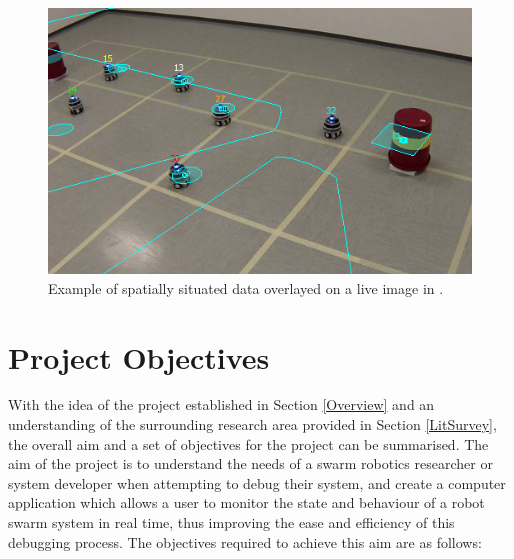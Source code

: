 \documentclass[titlepage,hidelinks,10pt]{article}
\begin{document}
\begin{figure}[H]
	\begin{center}
	\includegraphics[scale=0.8]{SpatiallySituatedData.png}
	\caption{Example of spatially situated data overlayed on a live image in \cite{LEDSwarmAR}.}
	\label{fig:SpatiallySituated}
	\end{center}
\end{figure}

\section{Project Objectives} \label{Objectives}
With the idea of the project established in Section \ref{Overview} and an understanding of the surrounding research area provided in Section \ref{LitSurvey}, the overall aim and a set of objectives for the project can be summarised. The aim of the project is to understand the needs of a swarm robotics researcher or system developer when attempting to debug their system, and create a computer application which allows a user to monitor the state and behaviour of a robot swarm system in real time, thus improving the ease and efficiency of this debugging process. The objectives required to achieve this aim are as follows:
\end{document}
